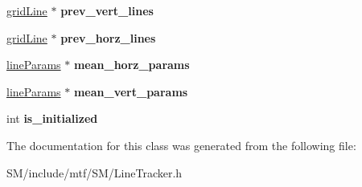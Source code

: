 \begin{DoxyCompactItemize}
\item 
\hypertarget{classLineTracker_a1ff877d36fa7b62ceacd9057dde67008}{\hyperlink{structgridLine}{grid\-Line} $\ast$ {\bfseries prev\-\_\-vert\-\_\-lines}}\label{classLineTracker_a1ff877d36fa7b62ceacd9057dde67008}

\item 
\hypertarget{classLineTracker_a6dbfee9c6517246fc236d6e66ed5b98a}{\hyperlink{structgridLine}{grid\-Line} $\ast$ {\bfseries prev\-\_\-horz\-\_\-lines}}\label{classLineTracker_a6dbfee9c6517246fc236d6e66ed5b98a}

\item 
\hypertarget{classLineTracker_aa4a9e69afc1ecb80990027d02608fa3e}{\hyperlink{structlineParams}{line\-Params} $\ast$ {\bfseries mean\-\_\-horz\-\_\-params}}\label{classLineTracker_aa4a9e69afc1ecb80990027d02608fa3e}

\item 
\hypertarget{classLineTracker_a6da360d20b22c82c8a268e9ad6c2cb19}{\hyperlink{structlineParams}{line\-Params} $\ast$ {\bfseries mean\-\_\-vert\-\_\-params}}\label{classLineTracker_a6da360d20b22c82c8a268e9ad6c2cb19}

\item 
\hypertarget{classLineTracker_a30019185a1c471dce129b8fa754ace27}{int {\bfseries is\-\_\-initialized}}\label{classLineTracker_a30019185a1c471dce129b8fa754ace27}

\end{DoxyCompactItemize}


The documentation for this class was generated from the following file\-:\begin{DoxyCompactItemize}
\item 
S\-M/include/mtf/\-S\-M/Line\-Tracker.\-h\end{DoxyCompactItemize}

